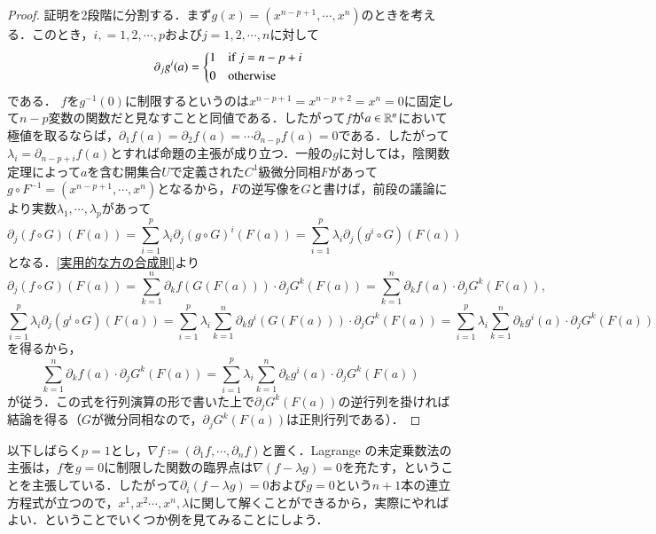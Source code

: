 \begin{proof}
証明を2段階に分割する．まず$g(x)= (x^{n-p+1}, \cdots, x^n)$のときを考える．このとき，$i, = 1,2, \cdots, p$および$j = 1,2, \cdots, n$に対して
\begin{equation}
\partial_j g^i(a) = \begin{dcases*}
    1 & if $j = n-p+i$ \\
    0 & otherwise
  \end{dcases*}
\end{equation}
である．
$f$を$g^{-1}(0)$に制限するというのは$x^{n-p+1} = x^{n-p+2} = x^n=0$に固定して$n-p$変数の関数だと見なすことと同値である．したがって$f$が$a \in \mathbb{R}^n$において極値を取るならば，$\partial_1 f(a) = \partial_2 f(a) = \cdots \partial_{n-p}f(a) =0$である．したがって$\lambda_i = \partial_{n-p+i} f(a)$とすれば命題の主張が成り立つ．一般の$g$に対しては，陰関数定理によって$a$を含む開集合$U$で定義された$C^1$級微分同相$F$があって$g \circ F^{-1} =  (x^{n-p+1}, \cdots, x^n)$となるから，$F$の逆写像を$G$と書けば，前段の議論により実数$\lambda_1, \cdots, \lambda_p$があって
\begin{equation}
\partial_j (f \circ G)(F(a)) = \sum_{i=1}^p \lambda_i \partial_j (g \circ G)^i(F(a)) = \sum_{i=1}^p \lambda_i \partial_j (g^i \circ G)(F(a))
\end{equation}となる．\cref{実用的な方の合成則}より
\begin{equation}
\partial_j (f \circ G)(F(a)) = \sum_{k=1}^n \partial_k f (G(F(a))) \cdot \partial_j G^k(F(a)) = \sum_{k=1}^n \partial_k f(a) \cdot \partial_j G^k(F(a)),
\end{equation}
\begin{equation}
\sum_{i=1}^p \lambda_i \partial_j (g^i \circ G)(F(a)) = \sum_{i=1}^p \lambda_i \sum_{k=1}^n \partial_k g^i (G(F(a))) \cdot \partial_j G^k(F(a)) = \sum_{i=1}^p \lambda_i \sum_{k=1}^n \partial_k g^i (a) \cdot \partial_j G^k(F(a)) 
\end{equation}を得るから，
\begin{equation}
\sum_{k=1}^n \partial_k f(a) \cdot \partial_j G^k(F(a)) = \sum_{i=1}^p \lambda_i \sum_{k=1}^n \partial_k g^i (a) \cdot \partial_j G^k(F(a))
\end{equation}が従う．この式を行列演算の形で書いた上で$\partial_j G^k(F(a))$の逆行列を掛ければ結論を得る（$G$が微分同相なので，$\partial_j G^k(F(a))$は正則行列である）．
\end{proof}

以下しばらく$p=1$とし，$\nabla f \coloneqq (\partial_1 f, \cdots, \partial_n f)$と置く．Lagrange の未定乗数法の主張は，$f$を$g=0$に制限した関数の臨界点は$\nabla(f-\lambda g)=0$を充たす，ということを主張している．したがって$\partial_i (f - \lambda g)=0$および$g=0$という$n+1$本の連立方程式が立つので，$x^1,x^2\cdots, x^n , \lambda$に関して解くことができるから，実際にやればよい．ということでいくつか例を見てみることにしよう．

